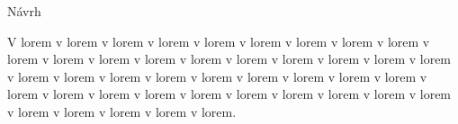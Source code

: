 
Návrh

V lorem v lorem v lorem v lorem v lorem v lorem v lorem v lorem v lorem v lorem v lorem v lorem v lorem v lorem v lorem v lorem v lorem v lorem v lorem v lorem v lorem v lorem v lorem v lorem v lorem v lorem v lorem v lorem v lorem v lorem v lorem v lorem v lorem v lorem v lorem v lorem v lorem v lorem v lorem v lorem v lorem v lorem v lorem.